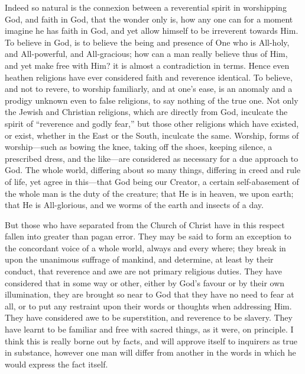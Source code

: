 Indeed so natural is the connexion between a reverential spirit in
worshipping God, and faith in God, that the wonder only is, how any
one can for a moment imagine he has faith in God, and yet allow
himself to be irreverent towards Him. To believe in God, is to believe
the being and presence of One who is All-holy, and All-powerful, and
All-gracious; how can a man really believe thus of Him, and yet make
free with Him? it is almost a contradiction in terms. Hence even
heathen religions have ever considered faith and reverence identical.
To believe, and not to revere, to worship familiarly, and at one's
ease, is an anomaly and a prodigy unknown even to false religions, to
say nothing of the true one. Not only the Jewish and Christian
religions, which are directly from God, inculcate the spirit of
``reverence and godly fear,'' but those other religions which
have existed, or exist, whether in the East or the South, inculcate
the same. Worship, forms of worship—such as bowing the knee, taking
off the shoes, keeping silence, a prescribed dress, and the like—are
considered as necessary for a due approach to God. The whole world,
differing about so many things, differing in creed and rule of life,
yet agree in this—that God being our Creator, a certain
self-abasement of the whole man is the duty of the creature; that He
is in heaven, we upon earth; that He is All-glorious, and we worms of
the earth and insects of a day.

But those who have separated from the Church of Christ have in this
respect fallen into greater than pagan error. They may be said to form
an exception to the concordant voice of a whole world, always and
every where; they break in upon the unanimous suffrage of mankind, and
determine, at least by their conduct, that reverence and awe are not
primary religious duties. They have considered that in some way or
other, either by God's favour or by their own illumination, they are
brought so near to God that they have no need to fear at all, or to
put any restraint upon their words or thoughts when addressing Him.
They have considered awe to be superstition, and reverence to be
slavery. They have learnt to be familiar and free with sacred things,
as it were, on principle. I think this is really borne out by facts,
and will approve itself to inquirers as true in substance, however one
man will differ from another in the words in which he would express
the fact itself.

